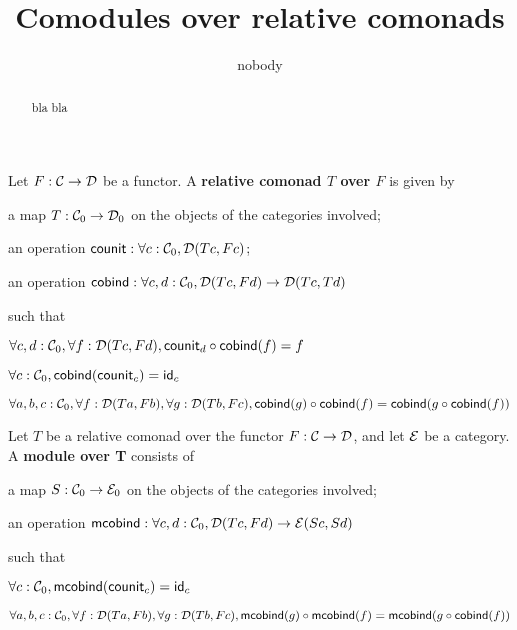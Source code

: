 \documentclass{amsart}
\author{nobody}
\title{Comodules over relative comonads}
\newcommand{\fat}[1]{\textbf{#1}}
\begin{document}
\begin{abstract}
  bla bla
\end{abstract}

\maketitle



\begin{definition}
  Let $F:\C\to\D$ be a functor. A \fat{relative comonad $T$ over $F$} is given by
  \begin{packitem}
   \item a map $T:\C_0 \to \D_0$ on the objects of the categories involved;
   \item an operation $\counit : \forall c : \C_0, \D(Tc,Fc)$;
   \item an operation $\cobind: \forall c,d:\C_0, \D(Tc,Fd) \to \D(Tc,Td)$
  \end{packitem}
  such that 
  \begin{packitem}
   \item $\forall c,d:\C_0, \forall f:\D(Tc,Fd), \comp{\cobind(f)}{\counit_d} = f$
   \item $\forall c : \C_0, \cobind(\counit_c) = \id_c$
   \item $\forall a,b,c:\C_0, \forall f : \D(Ta,Fb),\forall g:\D(Tb,Fc), \\
        \comp{\cobind(f)}{\cobind(g)} = \cobind(\comp{\cobind(f)}{g})$
  \end{packitem}

 
\end{definition}

\begin{definition}
\end{definition}

\begin{definition}
 Let $T$ be a relative comonad over the functor $F:\C\to\D$, and let $\E$ be a category.
 A \fat{module over T} consists of
   \begin{packitem}
   \item a map $S:\C_0 \to \E_0$ on the objects of the categories involved;
   \item an operation $\mcobind: \forall c,d:\C_0, \D(Tc,Fd) \to \E(Sc,Sd)$
  \end{packitem}
  such that 
  \begin{packitem}
   \item $\forall c : \C_0, \mcobind(\counit_c) = \id_c$
   \item $\forall a,b,c:\C_0, \forall f : \D(Ta,Fb),\forall g:\D(Tb,Fc), \\
        \comp{\mcobind(f)}{\mcobind(g)} = \mcobind(\comp{\cobind(f)}{g})$
  \end{packitem}

\end{definition}


\begin{definition}
\end{definition}





\end{document}
